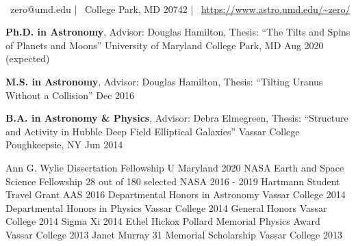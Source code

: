 \documentclass[]{awesome-cv}
\newcommand{\changeurlcolor}[1]{\hypersetup{urlcolor=#1}}
\begin{document}
    
\begin{center}
	  \\
	\vspace{2mm}
	{\faEnvelope\ zero@umd.edu} | {\faMapMarker\ College Park, MD 20742} | {\faLink\ \changeurlcolor{black}\href{https://www.astro.umd.edu/~zero/}{https://www.astro.umd.edu/\textasciitilde{}zero/}}
\end{center}
\begin{cventries}
	\cventry
	{\textbf{Ph.D. in Astronomy}, Advisor: Douglas Hamilton, Thesis: ``The Tilts and Spins of Planets and Moons''}
	{University of Maryland}
	{College Park, MD}
	{Aug 2020 (expected)}
	{}
	
	\vspace{-7mm}
	\cventry
	{\textbf{M.S. in Astronomy}, Advisor: Douglas Hamilton, Thesis: ``Tilting Uranus Without a Collision''}
	{}
	{}
	{Dec 2016}
	{}
	
	\vspace{-6mm}
	\cventry
	{\textbf{B.A. in Astronomy \& Physics}, Advisor: Debra Elmegreen, Thesis: ``Structure and Activity in	Hubble Deep Field Elliptical Galaxies''}
	{Vassar College}
	{Poughkeepsie, NY}
	{Jun 2014}
	{}
\end{cventries}
\vspace{-5mm}




\begin{cvhonors}
	\cvhonor
	{Ann G. Wylie Dissertation Fellowship}
	{}
	{U Maryland}
	{2020}
	\cvhonor
	{NASA Earth and Space Science Fellowship}
	{28 out of 180 selected}
	{NASA}
	{2016 - 2019}
	\cvhonor
	{Hartmann Student Travel Grant}
	{}
	{AAS}
	{2016}
	\cvhonor
	{Departmental Honors in Astronomy}
	{}
	{Vassar College}
	{2014}
	\cvhonor
	{Departmental Honors in Physics}
	{}
	{Vassar College}
	{2014}
	\cvhonor
	{General Honors}
	{}
	{Vassar College}
	{2014}
	\cvhonor
	{Sigma Xi}
	{}
	{}
	{2014}
	\cvhonor
	{Ethel Hickox Pollard Memorial Physics Award}
	{}
	{Vassar College}
	{2013}
	\cvhonor
	{Janet Murray \textquotesingle{}31 Memorial Scholarship}
	{}
	{Vassar College}
	{2013}
\end{cvhonors}
\end{document}
